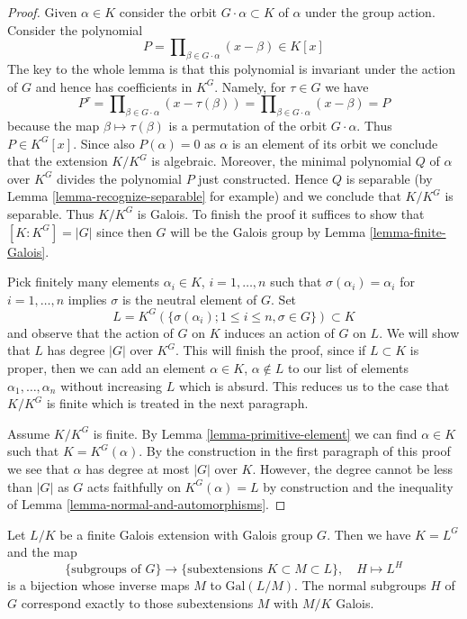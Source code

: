 \begin{proof}
Given $\alpha \in K$ consider the orbit $G \cdot \alpha \subset K$
of $\alpha$ under the group action. Consider the polynomial
$$
P = \prod\nolimits_{\beta \in G \cdot \alpha} (x - \beta) \in K[x]
$$
The key to the whole lemma is that this polynomial is invariant
under the action of $G$ and hence has coefficients in $K^G$.
Namely, for $\tau \in G$ we have
$$
P^\tau = \prod\nolimits_{\beta \in G \cdot \alpha} (x - \tau(\beta)) =
\prod\nolimits_{\beta \in G \cdot \alpha} (x - \beta) = P
$$
because the map $\beta \mapsto \tau(\beta)$ is a permutation of
the orbit $G \cdot \alpha$. Thus $P \in K^G[x]$. Since also
$P(\alpha) = 0$ as $\alpha$ is an element of its orbit
we conclude that the extension $K/K^G$ is algebraic. Moreover,
the minimal polynomial $Q$ of $\alpha$ over $K^G$ divides the
polynomial $P$ just constructed. Hence $Q$ is separable
(by Lemma \ref{lemma-recognize-separable} for example) and
we conclude that $K/K^G$ is separable. Thus $K/K^G$ is Galois.
To finish the proof it suffices to show that $[K : K^G] = |G|$
since then $G$ will be the Galois group by
Lemma \ref{lemma-finite-Galois}.

\medskip\noindent
Pick finitely many elements $\alpha_i \in K$, $i = 1, \ldots, n$
such that $\sigma(\alpha_i) = \alpha_i$ for $i = 1, \ldots, n$ implies
$\sigma$ is the neutral element of $G$. Set
$$
L = K^G(\{\sigma(\alpha_i); 1 \leq i \leq n, \sigma \in G\}) \subset K
$$
and observe that the action of $G$ on $K$ induces an action of $G$ on $L$.
We will show that $L$ has degree $|G|$ over $K^G$. This will finish the
proof, since if $L \subset K$ is proper, then we can add an element
$\alpha \in K$, $\alpha \not \in L$ to our list of elements
$\alpha_1, \ldots, \alpha_n$ without increasing $L$ which is absurd.
This reduces us to the case that $K/K^G$ is finite which is
treated in the next paragraph.

\medskip\noindent
Assume $K/K^G$ is finite. By Lemma \ref{lemma-primitive-element}
we can find $\alpha \in K$ such that $K = K^G(\alpha)$.
By the construction in the first paragraph of this proof we see
that $\alpha$ has degree at most $|G|$ over $K$. However, the
degree cannot be less than $|G|$ as $G$ acts faithfully on
$K^G(\alpha) = L$ by construction and the inequality of
Lemma \ref{lemma-normal-and-automorphisms}.
\end{proof}

\begin{theorem}
\label{theorem-galois-theory}
Let $L/K$ be a finite Galois extension with Galois group $G$.
Then we have $K = L^G$ and the map
$$
\{\text{subgroups of }G\}
\longrightarrow
\{\text{subextensions }K \subset M \subset L\},\quad
H \longmapsto L^H
$$
is a bijection whose inverse maps $M$ to $\text{Gal}(L/M)$.
The normal subgroups $H$ of $G$ correspond exactly to those
subextensions $M$ with $M/K$ Galois.
\end{theorem}

